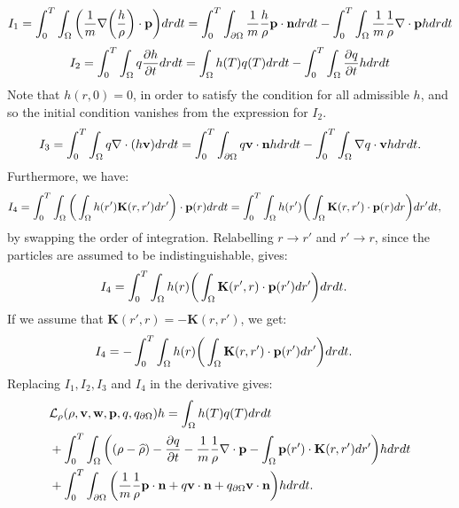 \begin{align*}
I_1 = \int_0^T \int_\Omega \bigg( \frac{1}{m}\nabla \bigg(\frac{h}{\rho}\bigg)\cdot \mathbf{p} \bigg)  dr dt  = \int_0^T \int_{\partial \Omega} \frac{1}{m} \frac{h}{\rho} \mathbf{p} \cdot \mathbf{n} dr dt - \int_0^T \int_\Omega \frac{1}{m} \frac{1}{\rho}\nabla \cdot \mathbf{p} h dr dt 
\end{align*}
\begin{align*}
I_2 = \int_0^T \int_\Omega q\frac{\partial h}{\partial t} dr dt = \int_\Omega h(T) q(T) dr dt - \int_0^T \int_\Omega  \frac{\partial q}{\partial t}h dr dt
\end{align*}
Note that ${h}(r,0)=0$, in order to satisfy the condition for all admissible ${h}$, and so the initial condition vanishes from the expression for $I_2$.
\begin{align*}
I_3= \int_0^T \int_\Omega q\nabla \cdot (h \mathbf{v}) dr dt = \int_0^T \int_{\partial \Omega} q \mathbf{v} \cdot \mathbf{n} h dr dt - \int_0^T \int_\Omega \nabla q \cdot \mathbf{v} h dr dt.
\end{align*}
Furthermore, we have:
\begin{align*}
I_{4}&= \int_0^T \int_\Omega \bigg(\int_\Omega  h(r') \mathbf{K}(r,r')dr'\bigg) \cdot \mathbf{p}(r) drdt=\int_0^T \int_\Omega  h(r')\bigg(\int_\Omega  \mathbf{K}(r,r')\cdot \mathbf{p}(r) dr \bigg)dr'dt,
\end{align*}
by swapping the order of integration. 
Relabelling $r \to r'$ and $r' \to r$, since the particles are assumed to be indistinguishable, gives:
\begin{align*}
I_{4}&= \int_0^T \int_\Omega  h(r)\bigg(\int_\Omega  \mathbf{K}(r',r) \cdot \mathbf{p}(r') dr' \bigg)drdt.
\end{align*}
If we assume that $\mathbf{K}(r',r) = - \mathbf{K}(r,r')$, we get:
\begin{align*}
I_{4}&= -\int_0^T \int_\Omega  h(r)\bigg(\int_\Omega  \mathbf{K}(r,r') \cdot \mathbf{p}(r') dr' \bigg)drdt.
\end{align*}
Replacing $I_1, I_2, I_3$ and $I_4$ in the derivative gives:
\begin{align*}
&\mathcal{L}_\rho(\rho,\mathbf{v},\mathbf{w},\mathbf{p},q,{q}_{\partial \Omega})h = \int_\Omega h(T) q(T) dr dt  \\
&+ \int_0^T \int_\Omega \bigg( (\rho - \widehat {\rho}) - \frac{\partial q}{\partial t} -\frac{1}{m} \frac{1}{\rho}\nabla \cdot \mathbf{p} -  \int_\Omega  \mathbf{p}(r') \cdot\mathbf{K}(r,r')   dr'  \bigg)hdr dt\\
&+\int_0^T \int_{\partial \Omega} \bigg( \frac{1}{m} \frac{1}{\rho} \mathbf{p} \cdot \mathbf{n} + q \mathbf{v} \cdot \mathbf{n}   +{q}_{\partial \Omega} \mathbf{v} \cdot \mathbf{n}\bigg)h  dr dt.
\end{align*}

